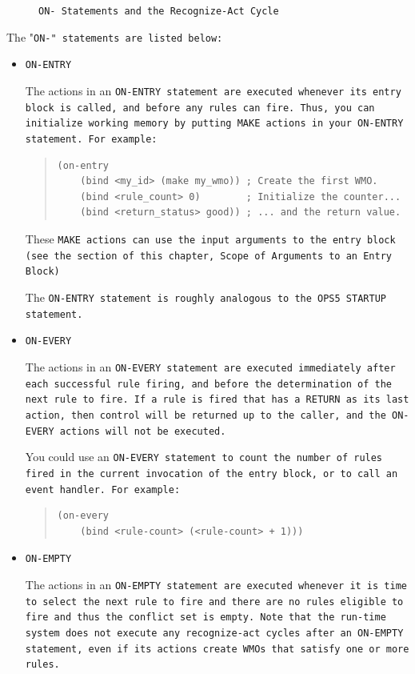 \begin{figure}[hb]
  \centering
  
  \caption{\tt{ON-} Statements and the Recognize-Act Cycle}
  \label{f:5-2}
\end{figure}

The "\tt{ON-}" statements are listed below:
\begin{itemize}
  \item \tt{ON-ENTRY}

    The actions in an \tt{ON-ENTRY} statement are executed whenever
    its entry block is called, and before any rules can fire.  Thus,
    you can initialize working memory by putting \tt{MAKE} actions in
    your \tt{ON-ENTRY} statement. For example:

    \begin{quote}
\begin{verbatim}
(on-entry
    (bind <my_id> (make my_wmo)) ; Create the first WMO.
    (bind <rule_count> 0)        ; Initialize the counter...
    (bind <return_status> good)) ; ... and the return value.
\end{verbatim}
    \end{quote}

These \tt{MAKE} actions can use the input arguments to the entry block
(see the section of this chapter, Scope of Arguments to an Entry
Block)

The \tt{ON-ENTRY} statement is roughly analogous to the OPS5
\tt{STARTUP} statement.

\item \tt{ON-EVERY}

  The actions in an \tt{ON-EVERY} statement are executed immediately
  after each successful rule firing, and before the determination of
  the next rule to fire. If a rule is fired that has a \tt{RETURN} as
  its last action, then control will be returned up to the caller, and
  the \tt{ON-EVERY} actions will not be executed.

  You could use an \tt{ON-EVERY} statement to count the number of
  rules fired in the current invocation of the entry block, or to call
  an event handler. For example:
  \begin{quote}
\begin{verbatim}
(on-every
    (bind <rule-count> (<rule-count> + 1)))
\end{verbatim}
  \end{quote}
        
\item \tt{ON-EMPTY}

  The actions in an \tt{ON-EMPTY} statement are executed whenever it
  is time to select the next rule to fire and there are no rules
  eligible to fire and thus the conflict set is empty. Note that the
  run-time system does not execute any recognize-act cycles after an
  \tt{ON-EMPTY} statement, even if its actions create WMOs that
  satisfy one or more rules.


\end{itemize}
